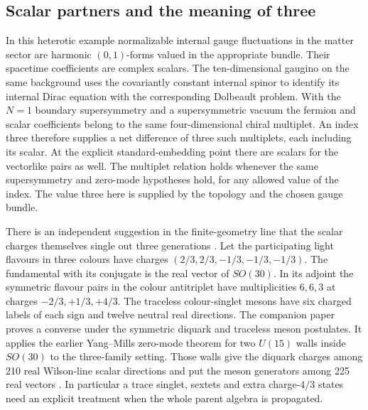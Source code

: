 \documentclass[aps,prd,reprint,onecolumn,nofootinbib,amsmath,amssymb]{revtex4-2}
\begin{document}
\subsection{Scalar partners and the meaning of three}
In this heterotic example normalizable internal gauge fluctuations in the matter sector are harmonic $(0,1)$-forms valued in the appropriate bundle. Their spacetime coefficients are complex scalars. The ten-dimensional gaugino on the same background uses the covariantly constant internal spinor to identify its internal Dirac equation with the corresponding Dolbeault problem. With the $N=1$ boundary supersymmetry and a supersymmetric vacuum the fermion and scalar coefficients belong to the same four-dimensional chiral multiplet. An index three therefore supplies a net difference of three such multiplets, each including its scalar. At the explicit standard-embedding point there are scalars for the vectorlike pairs as well. The multiplet relation holds whenever the same supersymmetry and zero-mode hypotheses hold, for any allowed value of the index. The value three here is supplied by the topology and the chosen gauge bundle.

There is an independent suggestion in the finite-geometry line that the scalar charges themselves single out three generations \cite{Rivero2005,Rivero2024,realnote}. Let the participating light flavours in three colours have charges $(2/3,2/3,-1/3,-1/3,-1/3)$. The fundamental with its conjugate is the real vector of $SO(30)$. In its adjoint the symmetric flavour pairs in the colour antitriplet have multiplicities $6,6,3$ at charges $-2/3,+1/3,+4/3$. The traceless colour-singlet mesons have six charged labels of each sign and twelve neutral real directions. The companion paper proves a converse under the symmetric diquark and traceless meson postulates. It applies the earlier Yang--Mills zero-mode theorem for two $U(15)$ walls inside $SO(30)$ to the three-family setting. Those walls give the diquark charges among 210 real Wilson-line scalar directions and put the meson generators among 225 real vectors \cite{realnote,TwoEndpoint2026}. In particular a trace singlet, sextets and extra charge-$4/3$ states need an explicit treatment when the whole parent algebra is propagated.
\end{document}
